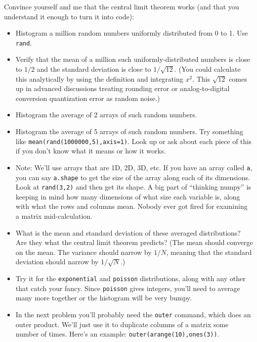\documentclass[11pt]{hmcpset}
\begin{document}
	\pagebreak
\begin{problem}

Convince yourself and me that the central limit theorem works (and that you understand it enough to turn it into code):
	\begin{itemize}
	\item Histogram a million random numbers uniformly distributed from 0 to 1. Use \texttt{rand}.
	\item Verify that the mean of a million such uniformly-distributed numbers is close to $1/2$ and the standard deviation is close to $1/\sqrt{12}$. (You could calculate this analytically by using the definition and integrating $x^2$. This $\sqrt{12}$ comes up in advanced discussions treating rounding error or analog-to-digital conversion quantization error as random noise.)
	\item Histogram the average of 2 arrays of such random numbers.
	\item Histogram the average of 5 arrays of such random numbers. Try something like \texttt{mean(rand(1000000,5),axis=1)}. Look up or ask about each piece of this if you don't know what it means or how it works.
	\item Note: We'll use arrays that are 1D, 2D, 3D, etc. If you have an array called \texttt{a}, you can say \texttt{a.shape} to get the size of the array along each of its dimensions. Look at \texttt{rand(3,2)} and then get its shape. A big part of ``thinking numpy'' is keeping in mind how many dimensions of what size each variable is, along with what the rows and columns mean. Nobody ever got fired for examining a matrix mid-calculation.
	\item What is the mean and standard deviation of these averaged distributions? Are they what the central limit theorem predicts? (The mean should converge on the mean. The variance should narrow by $1/N$, meaning that the standard deviation should narrow by $1/\sqrt{N}$.)
	\item Try it for the \texttt{exponential} and \texttt{poisson} distributions, along with any other that catch your fancy. Since \texttt{poisson} gives integers, you'll need to average many more together or the histogram will be very bumpy.
	\item In the next problem you'll probably need the \texttt{outer} command, which does an outer product. We'll just use it to duplicate columns of a matrix some number of times. Here's an example: \texttt{outer(arange(10),ones(3))}.
	\end{itemize}
\end{problem}
\end{document}
